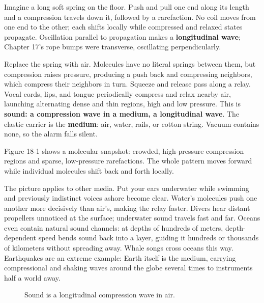 \begin{mainline}
Imagine a long soft spring on the floor. Push and pull one end along its length and a compression travels down it, followed by a rarefaction. No coil moves from one end to the other; each shifts locally while compressed and relaxed states propagate. Oscillation parallel to propagation makes a \textbf{longitudinal wave}; Chapter 17's rope bumps were transverse, oscillating perpendicularly.

Replace the spring with air. Molecules have no literal springs between them, but compression raises pressure, producing a push back and compressing neighbors, which compress their neighbors in turn. Squeeze and release pass along a relay. Vocal cords, lips, and tongue periodically compress and relax nearby air, launching alternating dense and thin regions, high and low pressure. This is \textbf{sound: a compression wave in a medium, a longitudinal wave}. The elastic carrier is the \textbf{medium}: air, water, rails, or cotton string. Vacuum contains none, so the alarm falls silent.

Figure 18-1 shows a molecular snapshot: crowded, high-pressure compression regions and sparse, low-pressure rarefactions. The whole pattern moves forward while individual molecules shift back and forth locally.

The picture applies to other media. Put your ears underwater while swimming and previously indistinct voices ashore become clear. Water's molecules push one another more decisively than air's, making the relay faster. Divers hear distant propellers unnoticed at the surface; underwater sound travels fast and far. Oceans even contain natural sound channels: at depths of hundreds of meters, depth-dependent speed bends sound back into a layer, guiding it hundreds or thousands of kilometers without spreading away. Whale songs cross oceans this way. Earthquakes are an extreme example: Earth itself is the medium, carrying compressional and shaking waves around the globe several times to instruments half a world away.
\end{mainline}

\begin{figure}[htbp]
\centering
{}
\caption{Sound is a longitudinal compression wave in air.}
\end{figure}

